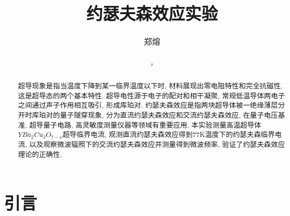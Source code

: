 \documentclass[font=default]{mpltx}
\makeatletter
\newcommand{\note}[1]{{\color{gray}#1}}
\newcommand*\file[1]{\textbf{\texttt{#1}}}
\newcommand\releasedate{%
    \href{https://github.com/CastleStar14654/PKUMpLtX/releases/tag/\mpltx@fileversion}%
        {\mpltx@filedate, \mpltx@fileversion}}
\makeatother
\begin{document}
\title{约瑟夫森效应实验} %
\author{郑熔} %
\date{\releasedate}
\begin{abstract}
  超导现象是指当温度下降到某一临界温度以下时, 材料展现出零电阻特性和完全抗磁性, 这是超导态的两个基本特性.
  超导电性源于电子的配对和相干凝聚, 常规低温导体两电子之间通过声子作用相互吸引, 形成库珀对.
  约瑟夫森效应是指两块超导体被一绝缘薄层分开时库珀对的量子隧穿现象, 分为直流约瑟夫森效应和交流约瑟夫森效应, 在量子电压基准, 超导量子电路, 高灵敏度测量仪器等领域有重要应用.
  本实验测量高温超导体$YBa_2Cu_3O_{7-x}$超导临界电流, 观测直流约瑟夫森效应得到77K温度下的约瑟夫森临界电流, 以及观察微波辐照下的交流约瑟夫森效应并测量得到微波频率, 验证了约瑟夫森效应理论的正确性.

\end{abstract}

\maketitle

\section{引言}
\end{document}
